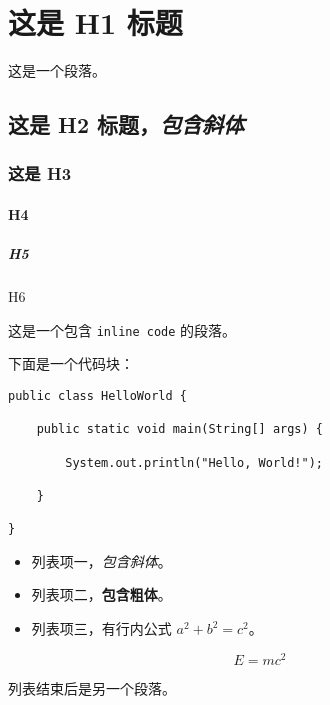 \section{这是 H1 标题}

这是一个段落。

\subsection{\texorpdfstring{这是 H2
标题，\emph{包含斜体}}{这是 H2 标题，包含斜体}}

\subsubsection{这是 H3}

\paragraph{H4}

\subparagraph{H5}

H6

这是一个包含 \texttt{inline\ code} 的段落。

下面是一个代码块：

\begin{verbatim}
public class HelloWorld {

    public static void main(String[] args) {

        System.out.println("Hello, World!");

    }

}
\end{verbatim}

\begin{itemize}
\item
  列表项一，\emph{包含斜体}。
\item
  列表项二，\textbf{包含粗体}。
\item
  列表项三，有行内公式 \(a^2 + b^2 = c^2\)。
\end{itemize}

\[E = mc^2\]

列表结束后是另一个段落。
